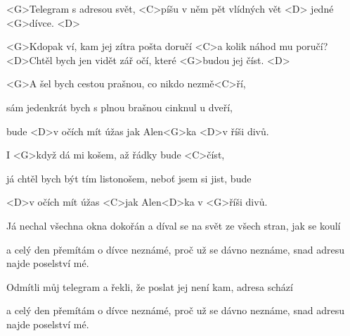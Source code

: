 
 \zs

<G>Telegram s adresou svět, <C>píšu v něm pět vlídných vět
<D> jedné <G>dívce. <D>

<G>Kdopak ví, kam jej zítra pošta doručí <C>a kolik náhod mu poručí? 
<D>Chtěl bych jen vidět zář očí, které <G>budou jej číst. <D>

\ks
\zr

<G>A šel bych cestou prašnou, co nikdo nezmě<C>ří,

sám jedenkrát bych s plnou brašnou cinknul u dveří,

bude <D>v očích mít úžas jak Alen<G>ka <D>v říši divů.

I <G>když dá mi košem, až řádky bude <C>číst,

já chtěl bych být tím listonošem, neboť jsem si jist, bude

<D>v očích mít úžas <C>jak Alen<D>ka v <G>říši divů. 

\kr
\zs

Já nechal všechna okna dokořán a díval se na svět ze všech stran, jak se koulí

a celý den přemítám o dívce neznámé, proč už se dávno neznáme, snad adresu 
najde poselství mé. 

\ks
\zr \kr
\zs

Odmítli můj telegram a řekli, že poslat jej není kam, adresa schází

a celý den přemítám o dívce neznámé, proč už se dávno neznáme, snad adresu 
najde poselství mé.

\ks

\zr \kr

\kp

